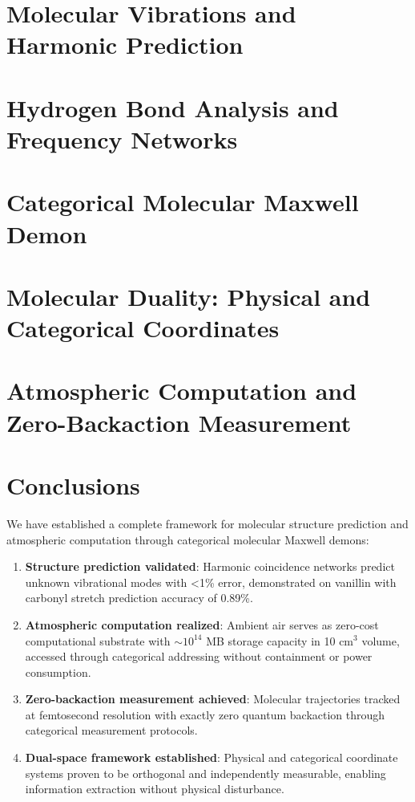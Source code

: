 \documentclass[11pt]{article}
\begin{document}
\section{Molecular Vibrations and Harmonic Prediction}
\label{sec:vibrations}


\section{Hydrogen Bond Analysis and Frequency Networks}
\label{sec:bond}


\section{Categorical Molecular Maxwell Demon}
\label{sec:demon}


\section{Molecular Duality: Physical and Categorical Coordinates}
\label{sec:duality}


\section{Atmospheric Computation and Zero-Backaction Measurement}
\label{sec:atmospheric}


\section{Conclusions}

We have established a complete framework for molecular structure prediction and atmospheric computation through categorical molecular Maxwell demons:

\begin{enumerate}
\item \textbf{Structure prediction validated}: Harmonic coincidence networks predict unknown vibrational modes with <1\% error, demonstrated on vanillin with carbonyl stretch prediction accuracy of 0.89\%.

\item \textbf{Atmospheric computation realized}: Ambient air serves as zero-cost computational substrate with $\sim$$10^{14}$ MB storage capacity in 10 cm$^3$ volume, accessed through categorical addressing without containment or power consumption.

\item \textbf{Zero-backaction measurement achieved}: Molecular trajectories tracked at femtosecond resolution with exactly zero quantum backaction through categorical measurement protocols.

\item \textbf{Dual-space framework established}: Physical and categorical coordinate systems proven to be orthogonal and independently measurable, enabling information extraction without physical disturbance.
\end{enumerate}
\end{document}
